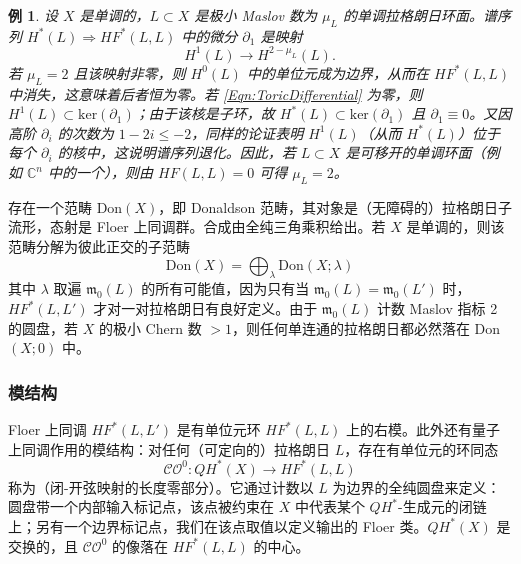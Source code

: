 \documentclass[11pt,a4paper]{article}
\numberwithin{equation}{section}
\newtheorem{Example}[thm]{例}
\newcommand{\bC}{\mathbb{C}}
\renewcommand{\ker}{\mathrm{ker}}
\providecommand{\frak}[1]{\mathfrak{#1}}
\begin{document}
\begin{Example} \label{Ex:ToricFibre}
设 $X$ 是单调的，$L\subset X$ 是极小 Maslov 数为 $\mu_L$ 的单调拉格朗日环面。谱序列 $H^*(L) \Rightarrow HF^*(L,L)$ 中的微分 $\partial_1$ 是映射
\begin{equation} \label{Eqn:ToricDifferential}
H^1(L) \longrightarrow H^{2-\mu_L}(L).
\end{equation}
若 $\mu_L=2$ 且该映射非零，则 $H^0(L)$ 中的单位元成为边界，从而在 $HF^*(L,L)$ 中消失，这意味着后者恒为零。若 \eqref{Eqn:ToricDifferential} 为零，则 $H^1(L) \subset \ker(\partial_1)$；由于该核是子环，故 $H^*(L) \subset \ker(\partial_1)$ 且 $\partial_1 \equiv 0$。又因高阶 $\partial_i$ 的次数为 $1-2i \leq -2$，同样的论证表明 $H^1(L)$（从而 $H^*(L)$）位于每个 $\partial_i$ 的核中，这说明谱序列退化。因此，若 $L\subset X$ 是\emph{可移开的}单调环面（例如 $\bC^n$ 中的一个），则由 $HF(L,L)=0$ 可得 $\mu_L = 2$。
\end{Example}

存在一个范畴 Don$(X)$，即 Donaldson 范畴，其对象是（无障碍的）拉格朗日子流形，态射是 Floer 上同调群。合成由全纯三角乘积给出。若 $X$ 是单调的，则该范畴分解为彼此正交的子范畴
\begin{equation} \label{Eqn:DonSplits}
\mathrm{Don}(X) = \bigoplus_{\lambda} \mathrm{Don}(X;\lambda)
\end{equation}
其中 $\lambda$ 取遍 $\frak{m}_0(L)$ 的所有可能值，因为只有当 $\frak{m}_0(L) = \frak{m}_0(L')$ 时，$HF^*(L,L')$ 才对一对拉格朗日有良好定义。由于 $\frak{m}_0(L)$ 计数 Maslov 指标 2 的圆盘，若 $X$ 的极小 Chern 数 $>1$，则任何单连通的拉格朗日都必然落在 Don$(X;0)$ 中。

\subsubsection{模结构}\label{Subsec:ModuleStructures}

Floer 上同调 $HF^*(L, L')$ 是有单位元环 $HF^*(L,L)$ 上的右模。此外还有量子上同调作用的模结构：对任何（可定向的）拉格朗日 $L$，存在有单位元的环同态
\begin{equation} \label{Eqn:ClosedOpen}
\mathcal{CO}^0: QH^*(X) \longrightarrow HF^*(L,L)
\end{equation}
称为（闭-开弦映射的长度零部分）。它通过计数以 $L$ 为边界的全纯圆盘来定义：圆盘带一个内部输入标记点，该点被约束在 $X$ 中代表某个 $QH^*$-生成元的闭链上；另有一个边界标记点，我们在该点取值以定义输出的 Floer 类。$QH^*(X)$ 是交换的，且 $\mathcal{CO}^0$ 的像落在 $HF^*(L,L)$ 的中心。
\end{document}
